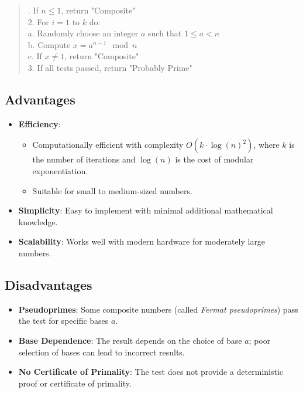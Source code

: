 \documentclass[12pt]{article}
\begin{document}
\begin{quote}. If \( n \leq 1 \), return "Composite" \\
2. For \( i = 1 \) to \( k \) do: \\
\hspace*{2em} a. Randomly choose an integer \( a \) such that \( 1 \leq a < n \) \\
\hspace*{2em} b. Compute \( x = a^{n-1} \mod n \) \\
\hspace*{2em} c. If \( x \neq 1 \), return "Composite" \\
3. If all tests passed, return "Probably Prime"
\end{quote}

\subsection*{Advantages}

\begin{itemize}
    \item \textbf{Efficiency}:
    \begin{itemize}
        \item Computationally efficient with complexity \( O(k \cdot \log(n)^2) \), where \( k \) is the number of iterations and \( \log(n) \) is the cost of modular exponentiation.
        \item Suitable for small to medium-sized numbers.
    \end{itemize}
    \item \textbf{Simplicity}: Easy to implement with minimal additional mathematical knowledge.
    \item \textbf{Scalability}: Works well with modern hardware for moderately large numbers.
\end{itemize}

\subsection*{Disadvantages}

\begin{itemize}
    \item \textbf{Pseudoprimes}: Some composite numbers (called \emph{Fermat pseudoprimes}) pass the test for specific bases \( a \).
    \item \textbf{Base Dependence}: The result depends on the choice of base \( a \); poor selection of bases can lead to incorrect results.
    \item \textbf{No Certificate of Primality}: The test does not provide a deterministic proof or certificate of primality.
\end{itemize}
\end{document}

